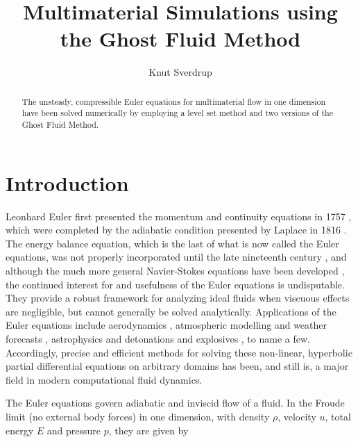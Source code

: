 \documentclass[final,3p,twocolumn,times]{elsarticle}
\begin{document}
\begin{frontmatter}

\title{Multimaterial Simulations using the Ghost Fluid Method}

\author{Knut Sverdrup}

\address{Cavendish Laboratory, Department of Physics, J J Thomson
  Avenue, Cambridge. CB3 0HE}

\begin{abstract}
    The unsteady, compressible Euler equations for multimaterial flow in one
    dimension have been solved numerically by employing a level set method and
    two versions of the Ghost Fluid Method. 
\end{abstract}

\end{frontmatter}

\section{Introduction}
\label{sec:introduction}

Leonhard Euler first presented the momentum and continuity equations in 1757
\cite{euler1757principes}, which were completed by the adiabatic condition
presented by Laplace in 1816 \cite{laplace1816vitesse}. The energy balance
equation, which is the last of what is now called the Euler equations,  was not
properly incorporated until the late nineteenth century
\cite{christodoulou2007euler}, and although the much more general Navier-Stokes
equations have been developed \cite{navier1822memoire, stokes1845theories}, the
continued interest for and usefulness of the Euler equations is undisputable.
They provide a robust framework for analyzing ideal fluids when viscuous
effects are negligible, but cannot generally be solved analytically.
Applications of the Euler equations include aerodynamics
\cite{drela1985twodimensional, anderson1986comparison, guruswamy1990unsteady},
atmospheric modelling and weather forecasts \cite{laprise1992euler,
skamarock2008time}, astrophysics \cite{trac2003primer} and detonations and
explosives \cite{nikiforakis1996numerical, williams1996detailed,
saurel2001multiphase}, to name a few.  Accordingly, precise and efficient
methods for solving these non-linear, hyperbolic partial differential equations
on arbitrary domains has been, and still is, a major field in modern
computational fluid dynamics. 

The Euler equations govern adiabatic and inviscid flow of a fluid. In the
Froude limit (no external body forces) in one dimension, with density $\rho$,
velocity $u$, total energy $E$ and pressure $p$, they are given by 
\end{document}
